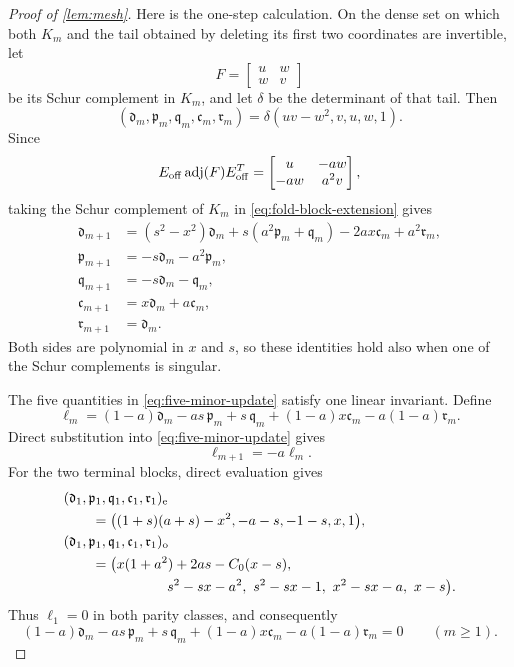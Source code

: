 \documentclass[review,hidelinks,onefignum,onetabnum]{siamart251216}
\begin{document}
\begin{proof}[Proof of \cref{lem:mesh}]
Here is the one-step calculation.  On the dense set on which both
\(K_m\) and the tail obtained by deleting its first two coordinates
are invertible, let
\[
 F=\begin{bmatrix}u&w\\w&v\end{bmatrix}
\]
be its Schur complement in \(K_m\), and let \(\delta\) be the
determinant of that tail.  Then
\[
 (\mathfrak d_m,\mathfrak p_m,\mathfrak q_m,\mathfrak c_m,\mathfrak r_m)
 =\delta(uv-w^2,v,u,w,1).
\]
Since
\[
 E_{\rm off}\operatorname{adj}(F)E_{\rm off}^T
 =
 \begin{bmatrix}u&-aw\\-aw&a^2v\end{bmatrix},
\]
taking the Schur complement of \(K_m\) in
\eqref{eq:fold-block-extension} gives
\begin{equation}\label{eq:five-minor-update}
\begin{aligned}
 \mathfrak d_{m+1}
 &= (s^2-x^2)\mathfrak d_m
    +s(a^2\mathfrak p_m+\mathfrak q_m)
    -2ax\mathfrak c_m+a^2\mathfrak r_m,\\
 \mathfrak p_{m+1}&=-s\mathfrak d_m-a^2\mathfrak p_m,\\
 \mathfrak q_{m+1}&=-s\mathfrak d_m-\mathfrak q_m,\\
 \mathfrak c_{m+1}&=x\mathfrak d_m+a\mathfrak c_m,\\
 \mathfrak r_{m+1}&=\mathfrak d_m.
\end{aligned}
\end{equation}
Both sides are polynomial in \(x\) and \(s\), so these identities hold
also when one of the Schur complements is singular.

The five quantities in \eqref{eq:five-minor-update} satisfy one linear
invariant.  Define
\[
 \ell_m=(1-a)\mathfrak d_m-as\,\mathfrak p_m+s\,\mathfrak q_m
       +(1-a)x\mathfrak c_m-a(1-a)\mathfrak r_m.
\]
Direct substitution into \eqref{eq:five-minor-update} gives
\[
 \ell_{m+1}=-a\ell_m.
\]
For the two terminal blocks, direct evaluation gives
\[
\begin{aligned}
&(\mathfrak d_1,\mathfrak p_1,\mathfrak q_1,\mathfrak c_1,\mathfrak r_1)_{\mathrm e}\\
&\qquad=\bigl((1+s)(a+s)-x^2,-a-s,-1-s,x,1\bigr),\\
&(\mathfrak d_1,\mathfrak p_1,\mathfrak q_1,\mathfrak c_1,\mathfrak r_1)_{\mathrm o}\\
&\qquad=\bigl(x(1+a^2)+2as-C_0(x-s),\\
&\hspace{26mm}s^2-sx-a^2,\ s^2-sx-1,\ x^2-sx-a,\ x-s\bigr).
\end{aligned}
\]
Thus \(\ell_1=0\) in both parity classes, and consequently
\begin{equation}\label{eq:fold-minor-invariant}
 (1-a)\mathfrak d_m-as\,\mathfrak p_m+s\,\mathfrak q_m
 +(1-a)x\mathfrak c_m-a(1-a)\mathfrak r_m=0
 \qquad(m\geq1).
\end{equation}


\end{proof}
\end{document}
